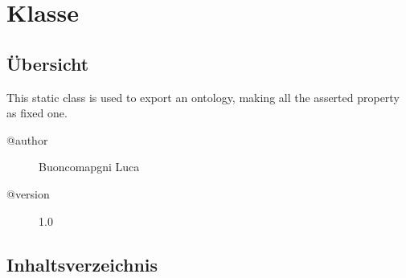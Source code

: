 
\section[InferedAxiomExporter]{Klasse }\label{ontologyFramework.OFContextManagement.InferedAxiomExporter-class}
\subsection{Übersicht}
This static class is used to export an ontology, 
 making all the asserted property as fixed one.
\begin{description}
\item[@author] 
Buoncomapgni Luca
\item[@version] 
1.0
\end{description}
\subsection{Inhaltsverzeichnis}
